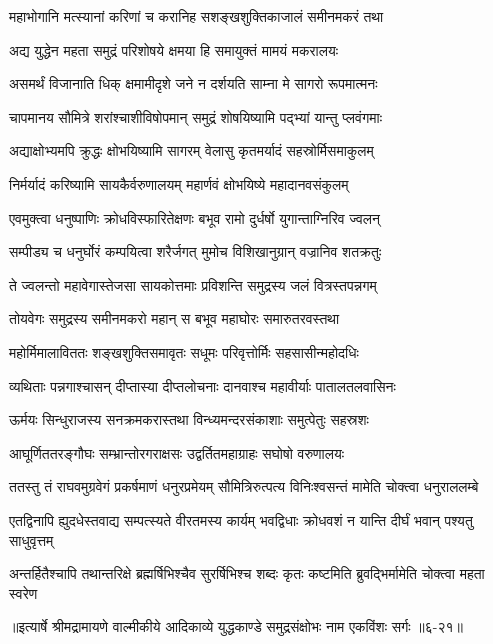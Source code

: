 \twolineshloka
{महाभोगानि मत्स्यानां करिणां च करानिह}
{सशङ्खशुक्तिकाजालं समीनमकरं तथा} %

\twolineshloka
{अद्य युद्धेन महता समुद्रं परिशोषये}
{क्षमया हि समायुक्तं मामयं मकरालयः} %

\twolineshloka
{असमर्थं विजानाति धिक् क्षमामीदृशे जने}
{न दर्शयति साम्ना मे सागरो रूपमात्मनः} %

\twolineshloka
{चापमानय सौमित्रे शरांश्चाशीविषोपमान्}
{समुद्रं शोषयिष्यामि पद्भ्यां यान्तु प्लवंगमाः} %

\twolineshloka
{अद्याक्षोभ्यमपि क्रुद्धः क्षोभयिष्यामि सागरम्}
{वेलासु कृतमर्यादं सहस्रोर्मिसमाकुलम्} %

\twolineshloka
{निर्मर्यादं करिष्यामि सायकैर्वरुणालयम्}
{महार्णवं क्षोभयिष्ये महादानवसंकुलम्} %

\twolineshloka
{एवमुक्त्वा धनुष्पाणिः क्रोधविस्फारितेक्षणः}
{बभूव रामो दुर्धर्षो युगान्ताग्निरिव ज्वलन्} %

\twolineshloka
{सम्पीड्य च धनुर्घोरं कम्पयित्वा शरैर्जगत्}
{मुमोच विशिखानुग्रान् वज्रानिव शतक्रतुः} %

\twolineshloka
{ते ज्वलन्तो महावेगास्तेजसा सायकोत्तमाः}
{प्रविशन्ति समुद्रस्य जलं वित्रस्तपन्नगम्} %

\twolineshloka
{तोयवेगः समुद्रस्य समीनमकरो महान्}
{स बभूव महाघोरः समारुतरवस्तथा} %

\twolineshloka
{महोर्मिमालाविततः शङ्खशुक्तिसमावृतः}
{सधूमः परिवृत्तोर्मिः सहसासीन्महोदधिः} %

\twolineshloka
{व्यथिताः पन्नगाश्चासन् दीप्तास्या दीप्तलोचनाः}
{दानवाश्च महावीर्याः पातालतलवासिनः} %

\twolineshloka
{ऊर्मयः सिन्धुराजस्य सनक्रमकरास्तथा}
{विन्ध्यमन्दरसंकाशाः समुत्पेतुः सहस्रशः} %

\twolineshloka
{आघूर्णिततरङ्गौघः सम्भ्रान्तोरगराक्षसः}
{उद्वर्तितमहाग्राहः सघोषो वरुणालयः} %

\twolineshloka
{ततस्तु तं राघवमुग्रवेगं प्रकर्षमाणं धनुरप्रमेयम्}
{सौमित्रिरुत्पत्य विनिःश्वसन्तं मामेति चोक्त्वा धनुराललम्बे} %

\twolineshloka
{एतद्विनापि ह्युदधेस्तवाद्य सम्पत्स्यते वीरतमस्य कार्यम्}
{भवद्विधाः क्रोधवशं न यान्ति दीर्घं भवान् पश्यतु साधुवृत्तम्} %

\twolineshloka
{अन्तर्हितैश्चापि तथान्तरिक्षे ब्रह्मर्षिभिश्चैव सुरर्षिभिश्च}
{शब्दः कृतः कष्टमिति ब्रुवद्भिर्मामेति चोक्त्वा महता स्वरेण} %


॥इत्यार्षे श्रीमद्रामायणे वाल्मीकीये आदिकाव्ये युद्धकाण्डे समुद्रसंक्षोभः नाम एकविंशः सर्गः ॥६-२१॥
